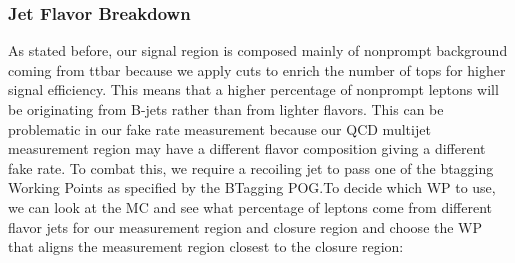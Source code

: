 \subsubsection{Jet Flavor Breakdown}\label{sec:nonprompt:flavor_breakdown}
As stated before, our signal region is composed mainly of nonprompt background coming from ttbar because we apply cuts to enrich the number of tops for higher signal efficiency. This means that a higher percentage of nonprompt leptons will be originating from B-jets rather than from lighter flavors. This can be problematic in our fake rate measurement because our QCD multijet measurement region may have a different flavor composition giving a different fake rate. To combat this, we require a recoiling jet to pass one of the btagging Working Points as specified by the BTagging POG.\@ To decide which WP to use, we can look at the MC and see what percentage of leptons come from different flavor jets for our measurement region and closure region and choose the WP that aligns the measurement region closest to the closure region:

